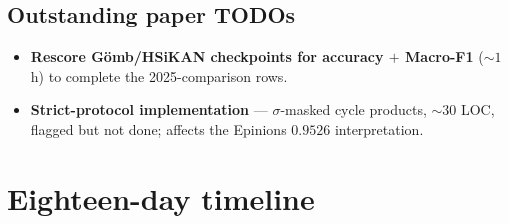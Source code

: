 \documentclass[11pt,a4paper]{article}
\begin{document}
\subsection{Outstanding paper TODOs}

\begin{itemize}
  \item \textbf{Rescore Gömb/HSiKAN checkpoints for accuracy $+$ Macro-F1}
        (${\sim}1$h) to complete the 2025-comparison rows.
  \item \textbf{Strict-protocol implementation} --- $\sigma$-masked cycle
        products, $\sim 30$ LOC, flagged but not done; affects the Epinions
        $0.9526$ interpretation.
\end{itemize}

\section{Eighteen-day timeline}
\end{document}

